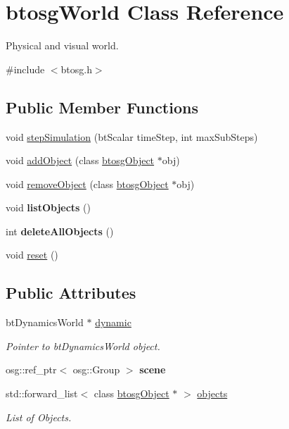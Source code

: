 \hypertarget{classbtosgWorld}{}\section{btosg\+World Class Reference}
\label{classbtosgWorld}


Physical and visual world.  




{\ttfamily \#include $<$btosg.\+h$>$}

\subsection*{Public Member Functions}
\begin{DoxyCompactItemize}
\item 
void \mbox{\hyperlink{classbtosgWorld_afce096686d8f84afd8b8fa3f2dc161b8}{step\+Simulation}} (bt\+Scalar time\+Step, int max\+Sub\+Steps)
\item 
void \mbox{\hyperlink{classbtosgWorld_ae5b71c6319dd420479096a265a1725b7}{add\+Object}} (class \mbox{\hyperlink{classbtosgObject}{btosg\+Object}} $\ast$obj)
\item 
void \mbox{\hyperlink{classbtosgWorld_a09e7791013d2c3a63bb0fb5d96396a4f}{remove\+Object}} (class \mbox{\hyperlink{classbtosgObject}{btosg\+Object}} $\ast$obj)
\item 
\mbox{\label{classbtosgWorld_a29bca57c9921aefec00d11cb2d441248}} 
void {\bfseries list\+Objects} ()
\item 
\mbox{\label{classbtosgWorld_a7c66f3c4d54d60b61856b9455173cd01}} 
int {\bfseries delete\+All\+Objects} ()
\item 
void \mbox{\hyperlink{classbtosgWorld_a6af4d066410a86b44fff5563667ea9a9}{reset}} ()
\end{DoxyCompactItemize}
\subsection*{Public Attributes}
\begin{DoxyCompactItemize}
\item 
bt\+Dynamics\+World $\ast$ \mbox{\hyperlink{classbtosgWorld_ad757a7b3b845142f200d1f2127e5372e}{dynamic}}
\begin{DoxyCompactList}\small\item\em Pointer to bt\+Dynamics\+World object. \end{DoxyCompactList}\item 
\mbox{\label{classbtosgWorld_ab6d438f54ccfc18955ea43e87731e008}} 
osg\+::ref\+\_\+ptr$<$ osg\+::\+Group $>$ {\bfseries scene}
\item 
std\+::forward\+\_\+list$<$ class \mbox{\hyperlink{classbtosgObject}{btosg\+Object}} $\ast$ $>$ \mbox{\hyperlink{classbtosgWorld_ab105aa8c0f8bdbdf323d47b902f6aca0}{objects}}
\begin{DoxyCompactList}\small\item\em List of Objects. \end{DoxyCompactList}\end{DoxyCompactItemize}


